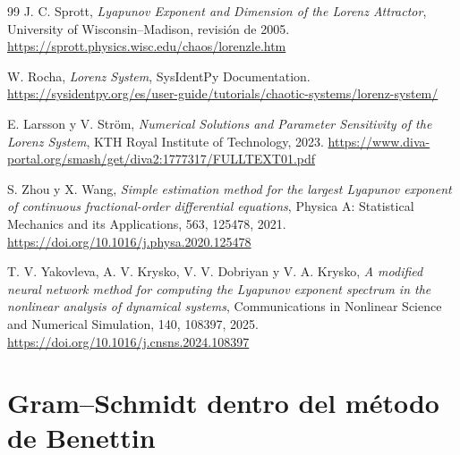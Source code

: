 \documentclass[12pt,a4paper,oneside]{report}
\theoremstyle{definition}
\numberwithin{equation}{chapter}
\begin{document}
\begin{thebibliography}{99}
 J. C. Sprott, \emph{Lyapunov Exponent and Dimension of the Lorenz Attractor}, University of Wisconsin--Madison, revisión de 2005. \url{https://sprott.physics.wisc.edu/chaos/lorenzle.htm}

 W. Rocha, \emph{Lorenz System}, SysIdentPy Documentation. \url{https://sysidentpy.org/es/user-guide/tutorials/chaotic-systems/lorenz-system/}

 E. Larsson y V. Ström, \emph{Numerical Solutions and Parameter Sensitivity of the Lorenz System}, KTH Royal Institute of Technology, 2023. \url{https://www.diva-portal.org/smash/get/diva2:1777317/FULLTEXT01.pdf}

 S. Zhou y X. Wang, \emph{Simple estimation method for the largest Lyapunov exponent of continuous fractional-order differential equations}, Physica A: Statistical Mechanics and its Applications, 563, 125478, 2021. \url{https://doi.org/10.1016/j.physa.2020.125478}

 T. V. Yakovleva, A. V. Krysko, V. V. Dobriyan y V. A. Krysko, \emph{A modified neural network method for computing the Lyapunov exponent spectrum in the nonlinear analysis of dynamical systems}, Communications in Nonlinear Science and Numerical Simulation, 140, 108397, 2025. \url{https://doi.org/10.1016/j.cnsns.2024.108397}

\end{thebibliography}

\appendix{}

\chapter{Gram--Schmidt dentro del método de Benettin}
\label{app:gram-schmidt}
\end{document}
